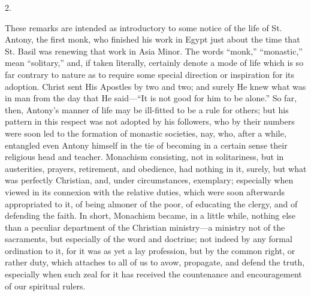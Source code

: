 2.

These remarks are intended as introductory to some notice of the
life of St. Antony, the first monk, who finished his work in Egypt
just about the time that St. Basil was renewing that work in Asia
Minor. The words ``monk,'' ``monastic,'' mean
``solitary,'' and, if taken literally, certainly denote a
mode of life which is so far contrary to nature as to require some
special direction or inspiration for its adoption. Christ sent His
Apostles by two and two; and surely He knew what was in man from the
day that He said—``It is not good for him to be alone.'' So
far, then, Antony's manner of life may be ill-fitted to be a rule for
others; but his pattern in this respect was not adopted by his
followers, who by their numbers were soon led to the formation of
monastic societies, nay, who, after a while, entangled even Antony
himself in the tie of becoming in a certain sense their religious head
and teacher. Monachism consisting, not in solitariness, but in
austerities, prayers, retirement, and obedience, had nothing in it,
surely, but what was perfectly Christian, and, under circumstances,
exemplary; especially when viewed in its connexion with the relative
duties, which were soon afterwards appropriated to it, of being
almoner of the poor, of educating the clergy, and of defending the
faith. In short, Monachism became, in a little while, nothing else
than a peculiar department of the Christian ministry—a ministry not
of the sacraments, but especially of the word and doctrine; not indeed
by any formal ordination to it, for it was as yet a lay profession,
but by the common right, or rather duty, which attaches to all of us
to avow, propagate, and defend the truth, especially when such zeal
for it has received the countenance and encouragement of our spiritual
rulers.

